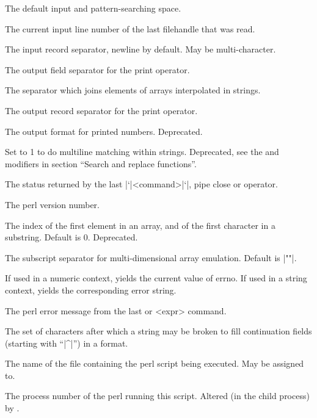 \begin{enum}{1cm}

The default input and pattern-searching space.

The current input line number of the last filehandle that was read.

The input record separator, newline by default. May be multi-character.

The output field separator for the print operator.

The separator which joins elements of arrays interpolated in strings.

The output record separator for the print operator.

The output format for printed numbers. Deprecated.

Set to 1 to do multiline matching within strings.
Deprecated, see the  and  modifiers in section 
``Search and replace functions''.

The status returned by the last |`|<command>|`|, pipe close or
 operator. 

The perl version number.

The index of the first element in an array, and of the first character
in a substring. Default is 0. Deprecated.

The subscript separator for multi-dimensional array emulation. Default
is |""|. 

If used in a numeric context, yields the current value of errno. If
used in a string context, yields the corresponding error string. 

The perl error message from the last  or  <expr> command.

The set of characters after which a string may be broken to fill
continuation fields (starting with ``|^|'') in a format. 

The name of the file containing the perl script being executed. May be
assigned to. 

The process number of the perl running this script. Altered (in the
child process) by . 


\end{enum}
